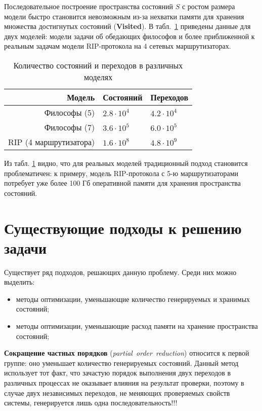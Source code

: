 \documentclass[12pt,a4paper,fleqn]{article}
\newcommand{\Code}[1]{\textbf{\mbox{#1}}}
\newcommand{\Term}[1]{\emph{\mbox{#1}}}
\begin{document}
Последовательное построение пространства состояний $S$ с ростом размера модели быстро становится
невозможным из-за нехватки памяти для хранения множества достигнутых состояний (\Code{Visited}). В
табл.~\ref{tab:models-statecount} приведены данные для двух моделей: модели задачи об обедающих
философов и более приближенной к реальным задачам модели RIP-протокола на 4 сетевых маршрутизаторах.

\begin{table}
  \centering
  \begin{tabular}{|r|l|l|}
    \hline
    Модель                  & Состояний         & Переходов       \\
    \hline
    Философы (5)            & $2.8 \cdot 10^4$  & $4.2 \cdot 10^4$ \\
    Философы (7)            & $3.6 \cdot 10^5$  & $6.0 \cdot 10^5$ \\
    RIP (4 маршрутизатора)  & $1.6 \cdot 10^8$  & $4.8 \cdot 10^9$ \\
    \hline
  \end{tabular}
  \caption{Количество состояний и переходов в различных моделях}
\label{tab:models-statecount}
\end{table}

Из табл. \ref{tab:models-statecount} видно, что для реальных моделей традиционный подход
становится проблематичен: к примеру, модель RIP-протокола с 5-ю маршрутизаторами потребует
уже более 100 Гб оперативной памяти для хранения пространства состояний.

\section{Существующие подходы к решению задачи}

Существует ряд подходов, решающих данную проблему. Среди них можно выделить:

\begin{itemize}
\item методы оптимизации, уменьшающие количество генерируемых и хранимых состояний;
\item методы оптимизации, уменьшающие расход памяти на хранение пространства состояний;
\end{itemize}

\textbf{Сокращение частных порядков} (\Term{partial order reduction}) относится к первой
группе: оно уменьшает количество генерируемых состояний. Данный метод использует тот факт,
что зачастую порядок выполнения двух переходов в различных процессах не оказывает влияния
на результат проверки, поэтому в случае двух независимых переходов, не меняющих
проверяемых свойств системы, генерируется лишь одна последовательность!!!
\end{document}
